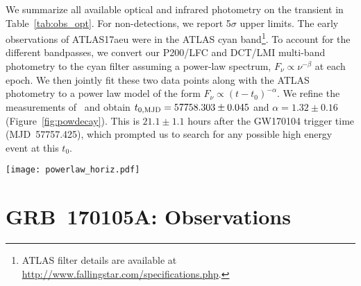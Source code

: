 \documentclass[twocolumn]{aastex6}
\begin{document}
We summarize all available optical and infrared photometry on the transient in Table~\ref{tab:obs_opt}. For non-detections, we report 5$\sigma$ upper limits. The early observations of ATLAS17aeu were in the ATLAS cyan band\footnote{ATLAS filter details are available at \url{http://www.fallingstar.com/specifications.php}.}. 
To account for the different bandpasses, we convert our P200/LFC and DCT/LMI multi-band photometry to the cyan filter assuming a power-law spectrum, $F_\nu \propto \nu^{-\beta}$ at each epoch. 
We then jointly fit these two data points along with the ATLAS photometry to a power law model of the form $F_\nu \propto (t - t_0)^{-\alpha}$. We refine the measurements of~\citet{GW170104_Palo} and obtain $t_{0, \rm MJD} = 57758.303 \pm 0.045$ and $\alpha = 1.32 \pm 0.16$ (Figure~\ref{fig:powdecay}). This is $21.1 \pm 1.1$ hours after the GW170104 trigger time (MJD~57757.425), which prompted us to search for any possible high energy event at this $t_0$.

\begin{figure*}[!tbh]
\texttt{[image: powerlaw\_horiz.pdf]}
\caption{\textit{Left panel:} The dashed red lines show a power-law fit of the form $F = F_0 (t - t_o)^{-\alpha}$, with $\alpha$ and $t_0$ as free parameters, to the cyan band data of ATLAS17aeu. We measure $\alpha = 1.32 \pm 0.16$ and $t_0 = 57758.303 \pm 0.045$ (MJD), $21.1 \pm 1.0$~hours after GW170104. This calculated explosion time is consistent with GRB~170105A, which occurred at MJD~57758.260. The solid black line shows a power law fit with $t_0$ fixed to the GRB time, and the X-axis shows days since MJD~57758.260. \textit{Right panel:} All optical and infrared photometry of ATLAS17aeu overplotted with the same power-law fit as the left panel. The X-axis is the time since GW170104. The solid blue vertical line marks the time of GRB~170105A. Points with downward pointing arrows are upper limits.}
\label{fig:powdecay}
\end{figure*}



\section{GRB~170105A: Observations}\label{sec:grb}
\end{document}

